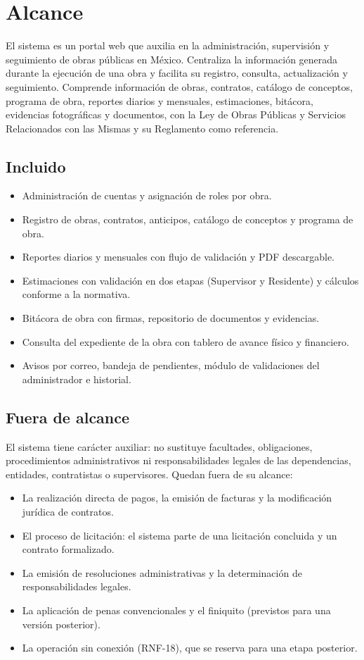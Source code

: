 \section{Alcance}
El sistema es un portal web que auxilia en la administración, supervisión y seguimiento de obras públicas en México. Centraliza la información generada durante la ejecución de una obra y facilita su registro, consulta, actualización y seguimiento. Comprende información de obras, contratos, catálogo de conceptos, programa de obra, reportes diarios y mensuales, estimaciones, bitácora, evidencias fotográficas y documentos, con la Ley de Obras Públicas y Servicios Relacionados con las Mismas y su Reglamento como referencia.

\subsection{Incluido}
\begin{itemize}
  \item Administración de cuentas y asignación de roles por obra.
  \item Registro de obras, contratos, anticipos, catálogo de conceptos y programa de obra.
  \item Reportes diarios y mensuales con flujo de validación y PDF descargable.
  \item Estimaciones con validación en dos etapas (Supervisor y Residente) y cálculos conforme a la normativa.
  \item Bitácora de obra con firmas, repositorio de documentos y evidencias.
  \item Consulta del expediente de la obra con tablero de avance físico y financiero.
  \item Avisos por correo, bandeja de pendientes, módulo de validaciones del administrador e historial.
\end{itemize}

\subsection{Fuera de alcance}
El sistema tiene carácter auxiliar: no sustituye facultades, obligaciones, procedimientos administrativos ni responsabilidades legales de las dependencias, entidades, contratistas o supervisores. Quedan fuera de su alcance:
\begin{itemize}
  \item La realización directa de pagos, la emisión de facturas y la modificación jurídica de contratos.
  \item El proceso de licitación: el sistema parte de una licitación concluida y un contrato formalizado.
  \item La emisión de resoluciones administrativas y la determinación de responsabilidades legales.
  \item La aplicación de penas convencionales y el finiquito (previstos para una versión posterior).
  \item La operación sin conexión (RNF-18), que se reserva para una etapa posterior.
\end{itemize}
